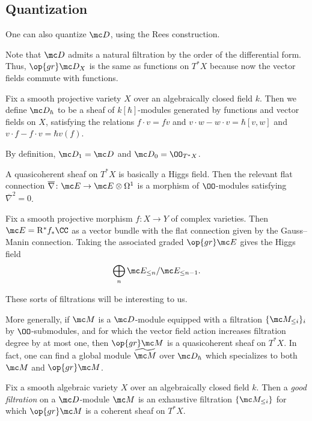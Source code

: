 \documentclass[../notes.tex]{subfiles}
\begin{document}
\subsection{Quantization}
One can also quantize $\mc D$, using the Rees construction.
\begin{remark}
	Note that $\mc D$ admits a natural filtration by the order of the differential form. Thus, $\op{gr}\mc D_X$ is the same as functions on $T^*X$ because now the vector fields commute with functions.
\end{remark}
\begin{notation}
	Fix a smooth projective variety $X$ over an algebraically closed field $k$. Then we define $\mc D_{\hbar}$ to be a sheaf of $k[\hbar]$-modules generated by functions and vector fields on $X$, satisfying the relations $f\cdot v=fv$ and $v\cdot w-w\cdot v=\hbar[v,w]$ and $v\cdot f-f\cdot v=\hbar v(f)$.
\end{notation}
\begin{example}
	By definition, $\mc D_1=\mc D$ and $\mc D_0=\OO_{T^*X}$.
\end{example}
\begin{example}
	A quasicoherent sheaf on $T^*X$ is basically a Higgs field. Then the relevant flat connection $\overline\nabla\colon\mc E\to\mc E\otimes\Omega^1$ is a morphism of $\OO$-modules satisfying $\overline\nabla^2=0$.
\end{example}
\begin{example}
	Fix a smooth projective morphism $f\colon X\to Y$ of complex varieties. Then $\mc E=\mathrm R^*f_*\CC$ as a vector bundle with the flat connection given by the Gauss--Manin connection. Taking the associated graded $\op{gr}\mc E$ gives the Higgs field
	\[\bigoplus_n\mc E_{\le n}/\mc E_{\le n-1}.\]
\end{example}
These sorts of filtrations will be interesting to us.
\begin{remark}
	More generally, if $\mc M$ is a $\mc D$-module equipped with a filtration $\{\mc M_{\le i}\}_i$ by $\OO$-submodules, and for which the vector field action increases filtration degree by at most one, then $\op{gr}\mc M$ is a quasicoherent sheaf on $T^*X$. In fact, one can find a global module $\widetilde{\mc M}$ over $\mc D_{\hbar}$ which specializes to both $\mc M$ and $\op{gr}\mc M$.
\end{remark}
\begin{definition}
	Fix a smooth algebraic variety $X$ over an algebraically closed field $k$. Then a \textit{good filtration} on a $\mc D$-module $\mc M$ is an exhaustive filtration $\{\mc M_{\le i}\}$ for which $\op{gr}\mc M$ is a coherent sheaf on $T^*X$.
\end{definition}
\end{document}
